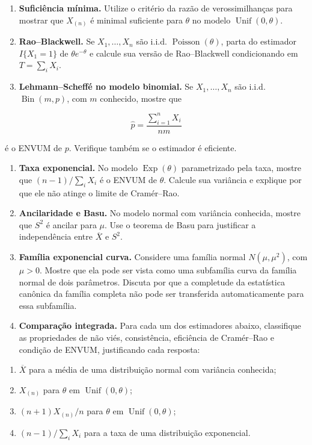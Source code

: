\documentclass[
  letterpaper,
  DIV=11,
  numbers=noendperiod]{scrreprt}
\begin{document}
\begin{enumerate}
\def\labelenumi{\arabic{enumi}.}
\setcounter{enumi}{5}
\item
  \textbf{Suficiência mínima.} Utilize o critério da razão de
  verossimilhanças para mostrar que \(X_{(n)}\) é minimal suficiente
  para \(\theta\) no modelo \(\operatorname{Unif}(0,\theta)\).
\item
  \textbf{Rao--Blackwell.} Se \(X_1,\ldots,X_n\) são i.i.d.
  \(\operatorname{Poisson}(\theta)\), parta do estimador \(I\{X_1=1\}\)
  de \(\theta e^{-\theta}\) e calcule sua versão de Rao--Blackwell
  condicionando em \(T=\sum_iX_i\).
\item
  \textbf{Lehmann--Scheffé no modelo binomial.} Se \(X_1,\ldots,X_n\)
  são i.i.d. \(\operatorname{Bin}(m,p)\), com \(m\) conhecido, mostre
  que
\end{enumerate}

\[\widehat{p}
=
\frac{\sum_{i=1}^nX_i}{nm}\]

é o ENVUM de \(p\). Verifique também se o estimador é eficiente.

\begin{enumerate}
\def\labelenumi{\arabic{enumi}.}
\setcounter{enumi}{8}
\item
  \textbf{Taxa exponencial.} No modelo \(\operatorname{Exp}(\theta)\)
  parametrizado pela taxa, mostre que \((n-1)/\sum_iX_i\) é o ENVUM de
  \(\theta\). Calcule sua variância e explique por que ele não atinge o
  limite de Cramér--Rao.
\item
  \textbf{Ancilaridade e Basu.} No modelo normal com variância
  conhecida, mostre que \(S^2\) é ancilar para \(\mu\). Use o teorema de
  Basu para justificar a independência entre \(\overline{X}\) e \(S^2\).
\item
  \textbf{Família exponencial curva.} Considere uma família normal
  \(N(\mu,\mu^2)\), com \(\mu>0\). Mostre que ela pode ser vista como
  uma subfamília curva da família normal de dois parâmetros. Discuta por
  que a completude da estatística canônica da família completa não pode
  ser transferida automaticamente para essa subfamília.
\item
  \textbf{Comparação integrada.} Para cada um dos estimadores abaixo,
  classifique as propriedades de não viés, consistência, eficiência de
  Cramér--Rao e condição de ENVUM, justificando cada resposta:
\end{enumerate}

\begin{enumerate}
\def\labelenumi{\alph{enumi}.}
\item
  \(\overline{X}\) para a média de uma distribuição normal com variância
  conhecida;
\item
  \(X_{(n)}\) para \(\theta\) em \(\operatorname{Unif}(0,\theta)\);
\item
  \((n+1)X_{(n)}/n\) para \(\theta\) em
  \(\operatorname{Unif}(0,\theta)\);
\item
  \((n-1)/\sum_iX_i\) para a taxa de uma distribuição exponencial.
\end{enumerate}
\end{document}
